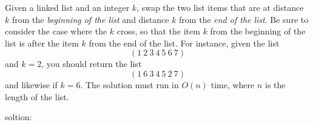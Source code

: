 
Given a linked list and an integer $k$, swap the two list items that are at distance $k$ from the {\it beginning of the list} and distance $k$ from the {\it end of the list}. Be sure to consider the case where the $k$ cross, so that the item $k$ from the beginning of the list is after the item $k$ from the end of the list. For instance, given the list $$(1\ 2\ 3\ 4\ 5\ 6\ 7)$$ and $k = 2$, you should return the list $$(1\ 6\ 3\ 4\ 5\ 2\ 7)$$ and likewise if $k = 6$. The solution must run in $O(n)$ time, where $n$ is the length of the list.
\hfill
\vfill
\bye
\hskip 2cm

soltion: 
